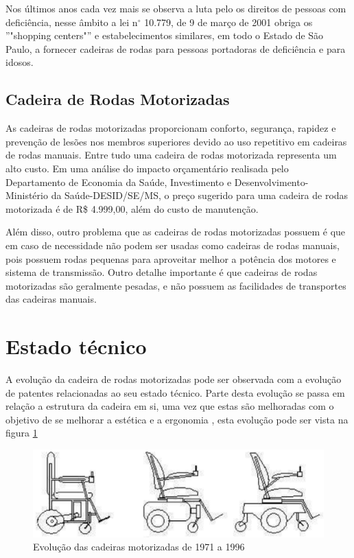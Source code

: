 Nos últimos anos cada vez mais se observa a luta pelo os direitos de pessoas com deficiência, nesse âmbito a lei n$^{\circ}$ 10.779, de 9 de março de 2001 obriga os ''"shopping centers"'' e estabelecimentos similares, em todo o Estado de São Paulo, a fornecer cadeiras de rodas para pessoas portadoras de deficiência e para idosos.

\subsection{Cadeira de Rodas Motorizadas}

As cadeiras de rodas motorizadas proporcionam conforto, segurança, rapidez e prevenção de lesões nos membros superiores devido ao uso repetitivo em cadeiras de rodas manuais. Entre tudo uma cadeira de rodas motorizada representa um alto custo. Em uma análise do impacto orçamentário realisada pelo Departamento de Economia da Saúde, Investimento e Desenvolvimento- Ministério da Saúde-DESID/SE/MS, o preço sugerido para uma cadeira de rodas motorizada é de R\$ 4.999,00, além do custo de manutenção. \cite{relatorio_sus}

Além disso, outro problema que as cadeiras de rodas motorizadas possuem é que em caso de necessidade não podem ser usadas como cadeiras de rodas manuais, pois possuem rodas pequenas para aproveitar melhor a potência dos motores e sistema de transmissão. Outro detalhe importante é que cadeiras de rodas motorizadas são geralmente pesadas, e não possuem as facilidades de transportes das cadeiras manuais.

\section{Estado técnico}

A evolução da cadeira de rodas motorizadas pode ser observada com a evolução de patentes relacionadas ao seu estado técnico. Parte desta evolução se passa em relação a estrutura da cadeira em si, uma vez que estas são melhoradas com o objetivo de se melhorar a estética e a ergonomia \cite{artigo_rudi}, esta evolução pode ser vista na figura \ref{fig:cadeiras_evolucao}

\begin{figure}[!htb]
\centering
  \includegraphics[keepaspectratio=true,scale=0.6]{figuras/introducao/cadeiras_evolucao}
\caption{Evolução das cadeiras motorizadas de 1971 a 1996}
\label{fig:cadeiras_evolucao}
\end{figure}

